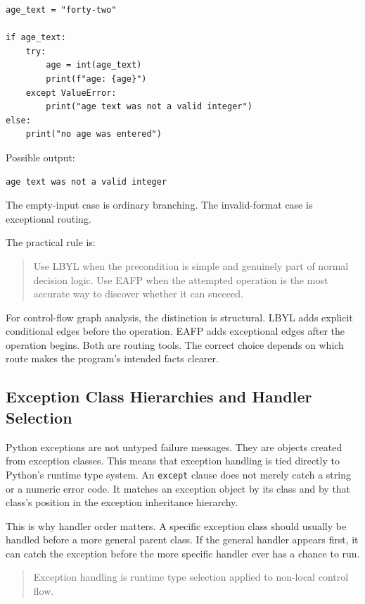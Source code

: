 \documentclass[a4paper,twoside]{report}
\begin{document}
\begin{verbatim}
age_text = "forty-two"

if age_text:
    try:
        age = int(age_text)
        print(f"age: {age}")
    except ValueError:
        print("age text was not a valid integer")
else:
    print("no age was entered")
\end{verbatim}

Possible output:

\begin{verbatim}
age text was not a valid integer
\end{verbatim}

The empty-input case is ordinary branching. The invalid-format case is exceptional routing.

The practical rule is:

\begin{quote}
Use LBYL when the precondition is simple and genuinely part of normal decision logic. Use EAFP when the attempted operation is the most accurate way to discover whether it can succeed.
\end{quote}

For control-flow graph analysis, the distinction is structural. LBYL adds explicit conditional edges before the operation. EAFP adds exceptional edges after the operation begins. Both are routing tools. The correct choice depends on which route makes the program's intended facts clearer.

\subsection{Exception Class Hierarchies and Handler Selection}

Python exceptions are not untyped failure messages. They are objects created from exception classes. This means that exception handling is tied directly to Python's runtime type system. An \texttt{except} clause does not merely catch a string or a numeric error code. It matches an exception object by its class and by that class's position in the exception inheritance hierarchy.

This is why handler order matters. A specific exception class should usually be handled before a more general parent class. If the general handler appears first, it can catch the exception before the more specific handler ever has a chance to run.

\begin{quote}
Exception handling is runtime type selection applied to non-local control flow.
\end{quote}
\end{document}
